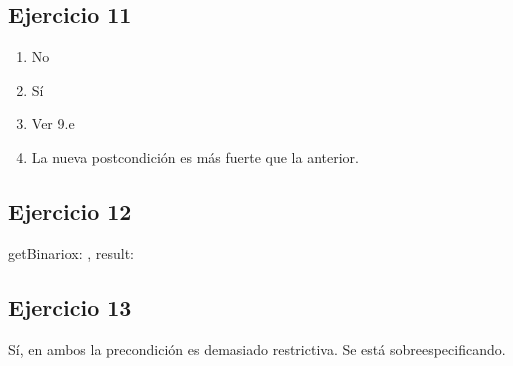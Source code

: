 \subsection{Ejercicio 11}
\begin{enumerate}[label=(\alph*)]
    \item No
    \item Sí
    \item Ver 9.e
    \item La nueva postcondición es más fuerte que la anterior.
\end{enumerate}

\subsection{Ejercicio 12}
\begin{proc}{getBinario}{\In x: \ent, \Out result: \TLista{\ent}}{}
\end{proc}

\subsection{Ejercicio 13}
Sí, en ambos la precondición es demasiado restrictiva. Se está sobreespecificando.

